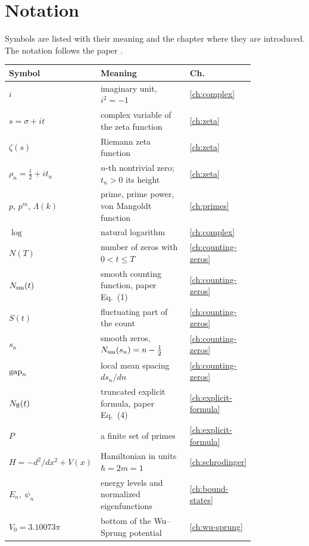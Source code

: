\renewcommand{\chapterart}{ap-notation}\renewcommand{\chapterartcaption}{The symbols of this book.}
\chapter{Notation}\label{ch:ap-notation}

Symbols are listed with their meaning and the chapter where they are introduced. The notation follows the paper \cite{soniR1}.

\begin{center}\small
\begin{tabular}{p{0.27\linewidth}p{0.55\linewidth}l}
\toprule
Symbol & Meaning & Ch.\\
\midrule
$i$ & imaginary unit, $i^2=-1$ & \ref{ch:complex}\\
$s=\sigma+it$ & complex variable of the zeta function & \ref{ch:zeta}\\
$\zeta(s)$ & Riemann zeta function & \ref{ch:zeta}\\
$\rho_n=\tfrac12+it_n$ & $n$-th nontrivial zero; $t_n>0$ its height & \ref{ch:zeta}\\
$p$, $p^m$, $\Lambda(k)$ & prime, prime power, von Mangoldt function & \ref{ch:primes}\\
$\log$ & natural logarithm & \ref{ch:complex}\\
$N(T)$ & number of zeros with $0<t\le T$ & \ref{ch:counting-zeros}\\
$N_{\mathrm{sm}}(t)$ & smooth counting function, paper Eq.~(1) & \ref{ch:counting-zeros}\\
$S(t)$ & fluctuating part of the count & \ref{ch:counting-zeros}\\
$s_n$ & smooth zeros, $N_{\mathrm{sm}}(s_n)=n-\tfrac12$ & \ref{ch:counting-zeros}\\
$\mathrm{gap}_n$ & local mean spacing $ds_n/dn$ & \ref{ch:counting-zeros}\\
$N_{\mathrm{fl}}(t)$ & truncated explicit formula, paper Eq.~(4) & \ref{ch:explicit-formula}\\
$P$ & a finite set of primes & \ref{ch:explicit-formula}\\
$H=-d^2/dx^2+V(x)$ & Hamiltonian in units $\hbar=2m=1$ & \ref{ch:schrodinger}\\
$E_n,\ \psi_n$ & energy levels and normalized eigenfunctions & \ref{ch:bound-states}\\
$V_0=3.10073\pi$ & bottom of the Wu--Sprung potential & \ref{ch:wu-sprung}\\

\end{tabular}
\end{center}

